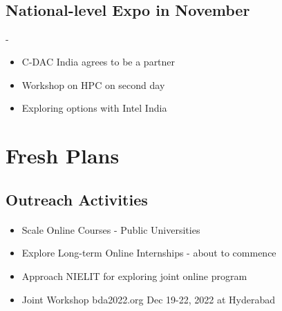 \subsection{\\National-level Expo in November}

\begin{frame}[fragile=singleslide]{\insertsectionhead - \insertsubsectionhead}
\begin{center}
\begin{itemize}
\item C-DAC India agrees to be a partner 
\item Workshop on HPC on second day
\item Exploring options with Intel India
\end{itemize}
\end{center}
\end{frame}

\section{Fresh Plans}

\subsection{Outreach Activities}

\begin{frame}[fragile=singleslide]{\insertsectionhead}
  \framesubtitle{\insertsubsectionhead}
\begin{center}
\begin{itemize}
\item Scale Online Courses - Public Universities
\item Explore Long-term Online Internships - about to commence
\item Approach NIELIT for exploring joint online program
\item Joint Workshop bda2022.org Dec 19-22, 2022 at Hyderabad
\end{itemize}
\end{center}
\end{frame}



%
